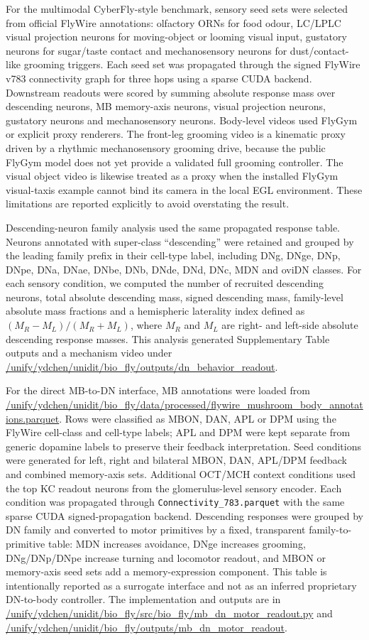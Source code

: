 \documentclass[10pt]{article}
\begin{document}
For the multimodal CyberFly-style benchmark, sensory seed sets were selected from official FlyWire annotations: olfactory ORNs for food odour, LC/LPLC visual projection neurons for moving-object or looming visual input, gustatory neurons for sugar/taste contact and mechanosensory neurons for dust/contact-like grooming triggers. Each seed set was propagated through the signed FlyWire v783 connectivity graph for three hops using a sparse CUDA backend. Downstream readouts were scored by summing absolute response mass over descending neurons, MB memory-axis neurons, visual projection neurons, gustatory neurons and mechanosensory neurons. Body-level videos used FlyGym or explicit proxy renderers. The front-leg grooming video is a kinematic proxy driven by a rhythmic mechanosensory grooming drive, because the public FlyGym model does not yet provide a validated full grooming controller. The visual object video is likewise treated as a proxy when the installed FlyGym visual-taxis example cannot bind its camera in the local EGL environment. These limitations are reported explicitly to avoid overstating the result.

Descending-neuron family analysis used the same propagated response table. Neurons annotated with super-class ``descending'' were retained and grouped by the leading family prefix in their cell-type label, including DNg, DNge, DNp, DNpe, DNa, DNae, DNbe, DNb, DNde, DNd, DNc, MDN and oviDN classes. For each sensory condition, we computed the number of recruited descending neurons, total absolute descending mass, signed descending mass, family-level absolute mass fractions and a hemispheric laterality index defined as \((M_R-M_L)/(M_R+M_L)\), where \(M_R\) and \(M_L\) are right- and left-side absolute descending response masses. This analysis generated Supplementary Table outputs and a mechanism video under \url{/unify/ydchen/unidit/bio_fly/outputs/dn_behavior_readout}.

For the direct MB-to-DN interface, MB annotations were loaded from \url{/unify/ydchen/unidit/bio_fly/data/processed/flywire_mushroom_body_annotations.parquet}. Rows were classified as MBON, DAN, APL or DPM using the FlyWire cell-class and cell-type labels; APL and DPM were kept separate from generic dopamine labels to preserve their feedback interpretation. Seed conditions were generated for left, right and bilateral MBON, DAN, APL/DPM feedback and combined memory-axis sets. Additional OCT/MCH context conditions used the top KC readout neurons from the glomerulus-level sensory encoder. Each condition was propagated through \texttt{Connectivity\_783.parquet} with the same sparse CUDA signed-propagation backend. Descending responses were grouped by DN family and converted to motor primitives by a fixed, transparent family-to-primitive table: MDN increases avoidance, DNge increases grooming, DNg/DNp/DNpe increase turning and locomotor readout, and MBON or memory-axis seed sets add a memory-expression component. This table is intentionally reported as a surrogate interface and not as an inferred proprietary DN-to-body controller. The implementation and outputs are in \url{/unify/ydchen/unidit/bio_fly/src/bio_fly/mb_dn_motor_readout.py} and \url{/unify/ydchen/unidit/bio_fly/outputs/mb_dn_motor_readout}.
\end{document}
